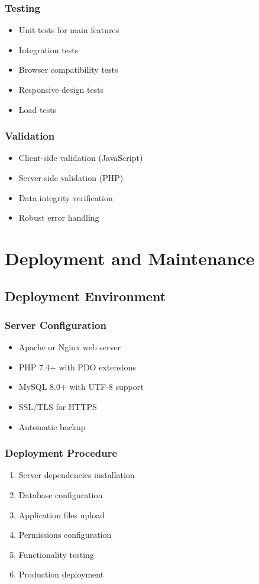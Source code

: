 \documentclass[12pt,a4paper]{report}
\begin{document}
\subsection{Testing}
\begin{itemize}
    \item Unit tests for main features
    \item Integration tests
    \item Browser compatibility tests
    \item Responsive design tests
    \item Load tests
\end{itemize}

\subsection{Validation}
\begin{itemize}
    \item Client-side validation (JavaScript)
    \item Server-side validation (PHP)
    \item Data integrity verification
    \item Robust error handling
\end{itemize}

\chapter{Deployment and Maintenance}

\section{Deployment Environment}

\subsection{Server Configuration}
\begin{itemize}
    \item Apache or Nginx web server
    \item PHP 7.4+ with PDO extensions
    \item MySQL 8.0+ with UTF-8 support
    \item SSL/TLS for HTTPS
    \item Automatic backup
\end{itemize}

\subsection{Deployment Procedure}
\begin{enumerate}
    \item Server dependencies installation
    \item Database configuration
    \item Application files upload
    \item Permissions configuration
    \item Functionality testing
    \item Production deployment
\end{enumerate}
\end{document}
